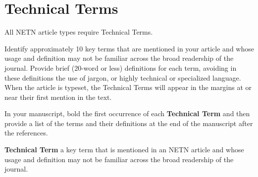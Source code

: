 \documentclass[NETN,manuscript]{stjour-new}
\begin{document}


\section{Technical Terms}

All NETN article types require Technical Terms.

Identify approximately 10 key terms that are mentioned in your article and whose usage and definition may not be familiar across the broad readership of the journal. 
Provide brief (20-word or less) definitions for each term, avoiding in these definitions the use of jargon, or highly technical or specialized language. 
When the article is typeset, the Technical Terms will appear in the margins at or near their first mention in the text.

In your manuscript, bold the first occurrence of each \textbf{Technical Term} and then provide a list of the terms and their definitions at the end of the manuscript after the references. 

\textbf{Technical Term} a key term that is mentioned in an NETN article and whose usage and definition may not be familiar across the broad readership of the journal. 
\end{document}
